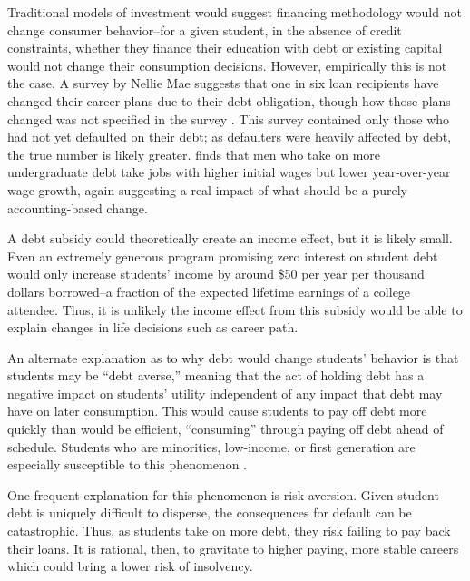 \documentclass[12pt]{article}
\begin{document}
	Traditional models of investment would suggest financing methodology would not change consumer behavior--for a given student, in the absence of credit constraints, whether they finance their education with debt or existing capital would not change their consumption decisions. However, empirically this is not the case. A survey by Nellie Mae suggests that one in six loan recipients have changed their career plans due to their debt obligation, though how those plans changed was not specified in the survey \parencite{baum2003}. This survey contained only those who had not yet defaulted on their debt; as defaulters were heavily affected by debt, the true number is likely greater. \textcite{minicozzi2005} finds that men who take on more undergraduate debt take jobs with higher initial wages but lower year-over-year wage growth, again suggesting a real impact of what should be a purely accounting-based change. 
	
	A debt subsidy could theoretically create an income effect, but it is likely small. Even an extremely generous program promising zero interest on student debt would only increase students' income by around \$50 per year per thousand dollars borrowed--a fraction of the expected lifetime earnings of a college attendee. Thus, it is unlikely the income effect from this subsidy would be able to explain changes in life decisions such as career path.
	
	An alternate explanation as to why debt would change students' behavior is that students may be ``debt averse,'' meaning that the act of holding debt has a negative impact on students' utility independent of any impact that debt may have on later consumption. This would cause students to pay off debt more quickly than would be efficient, ``consuming'' through paying off debt ahead of schedule. Students who are minorities, low-income, or first generation are especially susceptible to this phenomenon \parencite{burdman2005, field2009, callender2005}. 
	
	One frequent explanation for this phenomenon is risk aversion. Given student debt is uniquely difficult to disperse, the consequences for default can be catastrophic. Thus, as students take on more debt, they risk failing to pay back their loans. It is rational, then, to gravitate to higher paying, more stable careers which could bring a lower risk of insolvency. 
	
\end{document}
